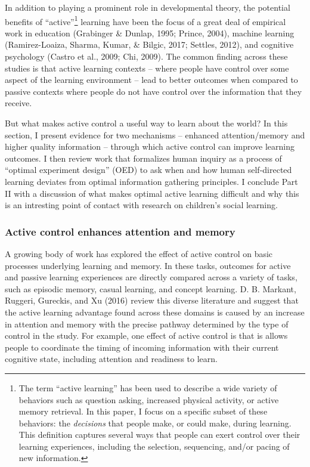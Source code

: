 \documentclass[english,man]{apa6}
\theoremstyle{definition}
\theoremstyle{definition}
\theoremstyle{definition}
\theoremstyle{remark}
\begin{document}
In addition to playing a prominent role in developmental theory, the
potential benefits of \enquote{active}\footnote{The term \enquote{active
  learning} has been used to describe a wide variety of behaviors such
  as question asking, increased physical activity, or active memory
  retrieval. In this paper, I focus on a specific subset of these
  behaviors: the \emph{decisions} that people make, or could make,
  during learning. This definition captures several ways that people can
  exert control over their learning experiences, including the
  selection, sequencing, and/or pacing of new information.} learning
have been the focus of a great deal of empirical work in education
(Grabinger \& Dunlap, 1995; Prince, 2004), machine learning
(Ramirez-Loaiza, Sharma, Kumar, \& Bilgic, 2017; Settles, 2012), and
cognitive psychology (Castro et al., 2009; Chi, 2009). The common
finding across these studies is that active learning contexts -- where
people have control over some aspect of the learning environment -- lead
to better outcomes when compared to passive contexts where people do not
have control over the information that they receive.

But what makes active control a useful way to learn about the world? In
this section, I present evidence for two mechanisms -- enhanced
attention/memory and higher quality information -- through which active
control can improve learning outcomes. I then review work that
formalizes human inquiry as a process of \enquote{optimal experiment
design} (OED) to ask when and how human self-directed learning deviates
from optimal information gathering principles. I conclude Part II with a
discussion of what makes optimal active learning difficult and why this
is an intresting point of contact with research on children's social
learning.

\subsubsection{Active control enhances attention and
memory}\label{active-control-enhances-attention-and-memory}

A growing body of work has explored the effect of active control on
basic processes underlying learning and memory. In these tasks, outcomes
for active and passive learning experiences are directly compared across
a variety of tasks, such as episodic memory, casual learning, and
concept learning. D. B. Markant, Ruggeri, Gureckis, and Xu (2016) review
this diverse literature and suggest that the active learning advantage
found across these domains is caused by an increase in attention and
memory with the precise pathway determined by the type of control in the
study. For example, one effect of active control is that is allows
people to coordinate the timing of incoming information with their
current cognitive state, including attention and readiness to learn.
\end{document}

